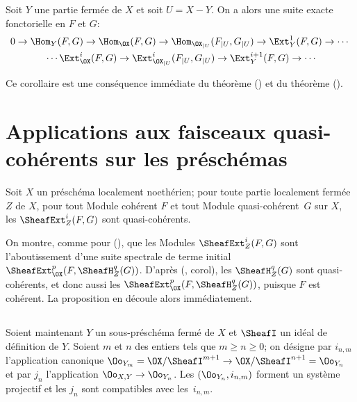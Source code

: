\begin{corollaire} \label{VI.1.9} Soit $Y$ une partie ferm\'ee de $X$ et soit $U=X{-} Y$. On a alors une suite exacte fonctorielle en $F$ et $G$:
\begin{gather*}
0 \to \Hom_Y(F, G) \to \Hom_{\OX}(F, G) \to \Hom_{{\OX}_{|U}}(F_{|U}, G_{|U}) \to \Ext_{Y}^1(F, G) \to \cdots{}\\
{}\cdots \Ext_{{\OX}}^i(F, G) \to \Ext_{{{\OX}_{|U}}}^i(F_{|U}, G_{|U}) \to \Ext_{Y}^{i+1}(F, G) \to \cdots
\end{gather*}
\end{corollaire}

Ce corollaire est une cons\'equence imm\'ediate du th\'eor\`eme () et du th\'eor\`eme ().

\section{Applications aux faisceaux quasi-coh\'erents sur les pr\'esch\'emas} \label{VI.2}
\pageoriginale
\begin{proposition} \label{VI.2.1}
Soit $X$ un pr\'esch\'ema localement noeth\'erien; pour toute partie localement ferm\'ee $Z$ de $X$, pour tout Module coh\'erent $F$ et tout Module quasi-coh\'erent~$G$ sur $X$, les $\SheafExt_Z^i(F, G)$ sont quasi-coh\'erents.
\end{proposition}

On montre, comme pour (), que les Modules $\SheafExt_Z^i(F, G)$ sont l'aboutissement d'une suite spectrale de terme initial $\SheafExt_{\OX}^p(F, \SheafH_Z^q (G))$. D'apr\`es (, corol\ptbl {}), les $\SheafH_Z^q(G)$ sont quasi-coh\'erents, et donc aussi les $\SheafExt_{\OX}^p (F, \SheafH_Z^q (G))$, puisque $F$ est coh\'erent. La proposition en d\'ecoule alors imm\'ediatement.

\begin{empty} \label{VI.2.2}
\end{empty}

\subsection{} Soient maintenant $Y$ un sous-pr\'esch\'ema ferm\'e de $X$ et $\SheafI$ un id\'eal de d\'efinition de $Y$. Soient $m$ et $n$ des entiers tels que $m\geq n \geq 0$; on d\'esigne par $i_{n, m}$ l'application canonique $\Oo_{Y_m} = \OX/\SheafI^{m+1} \to \OX/\SheafI^{n+1} = \Oo_{Y_n}$ et par $j_n$ l'application \hbox{$\Oo_{X, Y}\to \Oo_{Y_n}$}. Les $(\Oo_{Y_n}, i_{n, m})$ forment un syst\`eme projectif et les $j_n$ sont compatibles avec les~$i_{n, m}$.


